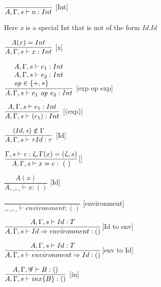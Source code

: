 
\hspace*{10em}
$ \dfrac{\phantom{}} {A, \Gamma, s \vdash{} n: Int}$ [Int]\bigskip

Here \textit{x} is a special Int that is not of the form
\textit{Id.Id}\bigskip

\hspace*{10em}
$ \dfrac{A(x)=Int}{A, \Gamma, s \vdash{} x: Int}$ [x]\bigskip

\hspace*{10em}
$\dfrac{
\begin{array}{l}
    A, \Gamma, s \vdash{} e_1 : Int\\
    A, \Gamma, s \vdash{} e_2 : Int\\
    \text{\textit{op}} \in \{+,*\}
\end{array}}
{A, \Gamma, s \vdash{} e_1 \text{\textit{ op }} e_2: Int}$
[exp op exp]\bigskip


\hspace*{10em}
$ \dfrac{A, \Gamma, s \vdash{}e_1:Int}{A, \Gamma, s \vdash{} (e_1): Int}$ [(exp)]\bigskip


\hspace*{10em}
$ \dfrac{(Id, s)\notin \Gamma}{A, \Gamma, s \vdash{} \tau Id : \tau}$ [Id]\bigskip

\hspace*{10em}
$ \dfrac{\Gamma, s \vdash e : \upzeta, \Gamma (x) = (\upzeta,s)}
{A, \Gamma, s \vdash{} x=e:~(~)} $[]\bigskip

\hspace*{10em}
$ \dfrac{A(x)}{A,\_,\_ \vdash x:()}$ [Id]\bigskip

\hspace*{10em}
$ \dfrac{\phantom{}}{\_,\_,\_ \vdash environment: ()}$ [environment]\bigskip

\hspace*{10em}
$ \dfrac{A, \Gamma, s \vdash{} Id:T}{A, \Gamma, s \vdash{} Id \Rightarrow environment : ()}$[Id to env]\bigskip

\hspace*{10em}
$ \dfrac{A, \Gamma, s \vdash{} Id:T}{A, \Gamma, s \vdash{} environment \Rightarrow Id : ()}$[env to Id]\bigskip

\hspace*{10em}
$ \dfrac{A, \Gamma, \mathscr{G} \vdash B : ()}{A, \Gamma, s \vdash{} in x\{ B \} : ()}$ [in]\bigskip

